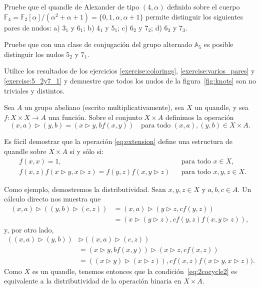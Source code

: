\documentclass[graybox]{svmult}
\newcommand{\F}{\mathbb{F}}
\newcommand{\Alt}{\mathbb{A}}
\begin{document}
\begin{exercise}
    \label{exercise:varios_pares}
		Pruebe que el quandle de Alexander de tipo $(4,\alpha)$ definido sobre
		el cuerpo
		$\F_4=\F_2[\alpha]/(\alpha^2+\alpha+1)=\{0,1,\alpha,\alpha+1\}$ permite
		distinguir los siguientes pares de nudos: a) $3_1$ y $6_1$; b) $4_1$ y
$5_1$; c) $6_2$ y $7_2$; d) $6_3$ y $7_3$.
\end{exercise}

\begin{exercise}
    \label{exercise:5_2y7_1}
	Pruebe que con una clase de conjugación del grupo alternado $\Alt_5$ es
	posible distinguir los nudos $5_2$ y $7_1$. 
\end{exercise}

\begin{exercise}
    Utilice los resultados de los ejercicios \ref{exercise:colorings},
    \ref{exercise:varios_pares} y \ref{exercise:5_2y7_1} y demuestre que todos los nudos
    de la figura~\ref{fig:knots} son no triviales y distintos.
\end{exercise}

Sea $A$ un grupo abeliano (escrito multiplicativamente), sea $X$ un quandle, y sea 
$f\colon X\times X\to A$ una función. Sobre el conjunto $X\times A$ definimos la
operación
\begin{equation}
	\label{eq:extension}
	(x,a)\triangleright (y,b)=(x\triangleright y, bf(x,y))\quad\text{para todo $(x,a),(y,b)\in X\times A$}.
\end{equation}

Es fácil demostrar que la operación \eqref{eq:extension} define una
estructura de quandle sobre $X\times A$ si y sólo si:
\begin{align}
	\label{eq:2cocycle1}&f(x,x)=1,&&\text{para todo $x\in X$},\\
	\label{eq:2cocycle2}&f(x,z)f(x\triangleright y,x\triangleright z)=f(y,z)f(x,y\triangleright z)&&\text{para todo $x,y,z\in X$}.
\end{align}

\medskip
Como ejemplo, demostremos la distributividad. Sean $x,y,z\in X$ y
$a,b,c\in A$. Un cálculo directo nos muestra que 
\begin{align*}
	(x,a)\triangleright( (y,b)\triangleright (c,z))&=(x,a)\triangleright (y\triangleright z, cf(y,z))\\
	&=(x\triangleright(y\triangleright z), cf(y,z)f(x,y\triangleright z)),
\end{align*}
y, por otro lado, 
\begin{align*}
	\left( (x,a)\triangleright(y,b) \right)&\triangleright \left( (x,a)\triangleright (c,z) \right)\\
	&=(x\triangleright y,bf(x,y))\triangleright (x\triangleright z, cf(x,z))\\
&=\left( (x\triangleright y)\triangleright (x\triangleright z) \right), cf(x,z)f(x\triangleright y,x\triangleright z)).
	\end{align*}
	Como $X$ es un quandle, tenemos entonces que la
	condición~\eqref{eq:2cocycle2} es equivalente a la distributividad de la
	operación binaria en $X\times A$.
\end{document}
